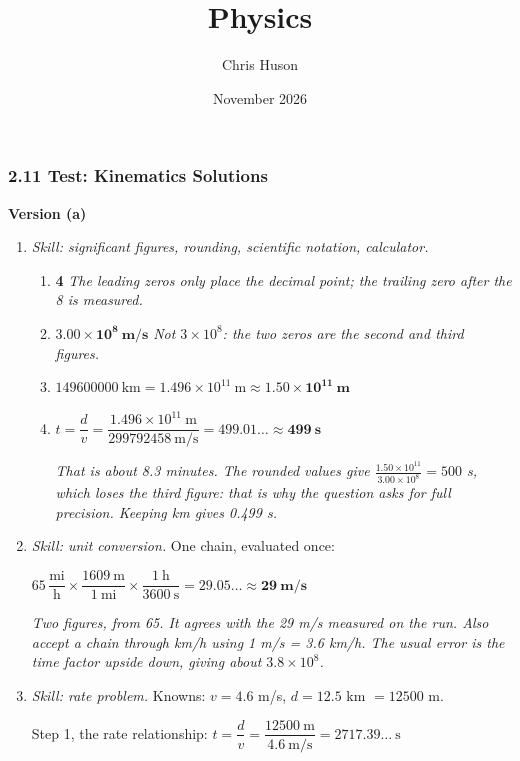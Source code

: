 \documentclass[12pt, twoside]{article}
\title{Physics}
\author{Chris Huson}
\date{November 2026}
\begin{document}
\subsubsection*{2.11 Test: Kinematics Solutions}

\textbf{\large Version (a)}

\begin{enumerate}[itemsep=0.5cm]

\item \emph{Skill: significant figures, rounding, scientific notation, calculator.}
  \begin{enumerate}[itemsep=0.3cm]
    \item \textbf{4} \quad \emph{The leading zeros only place the decimal point;
      the trailing zero after the 8 is measured.}
    \item $\mathbf{3.00 \times 10^{8}~\textbf{m/s}}$ \quad \emph{Not $3 \times
      10^8$: the two zeros are the second and third figures.}
    \item $\num{149600000}~\text{km} = 1.496 \times 10^{11}~\text{m} \approx
      \mathbf{1.50 \times 10^{11}~\textbf{m}}$
    \item $t = \dfrac{d}{v} = \dfrac{1.496 \times 10^{11}~\text{m}}{\num{299792458}
      ~\text{m/s}} = 499.01\ldots \approx \mathbf{499~\textbf{s}}$

      \emph{That is about 8.3 minutes. The rounded values give
      $\frac{1.50 \times 10^{11}}{3.00 \times 10^{8}} = 500$ s, which loses the
      third figure: that is why the question asks for full precision. Keeping km
      gives 0.499 s.}
  \end{enumerate}

\item \emph{Skill: unit conversion.} One chain, evaluated once:

  $65\,\dfrac{\text{mi}}{\text{h}} \times \dfrac{1609~\text{m}}{1~\text{mi}} \times
  \dfrac{1~\text{h}}{3600~\text{s}} = 29.05\ldots \approx
  \mathbf{29~\textbf{m/s}}$

  \emph{Two figures, from 65. It agrees with the 29 m/s measured on the run. Also
  accept a chain through km/h using 1 m/s = 3.6 km/h. The usual error is the time
  factor upside down, giving about $3.8 \times 10^{8}$.}

\item \emph{Skill: rate problem.} Knowns: $v = 4.6$ m/s, $d = 12.5$ km
  $= \num{12500}$ m.

  Step 1, the rate relationship: \quad $t = \dfrac{d}{v} =
  \dfrac{\num{12500}~\text{m}}{4.6~\text{m/s}} = 2717.39\ldots~\text{s}$


\end{enumerate}
\end{document}
